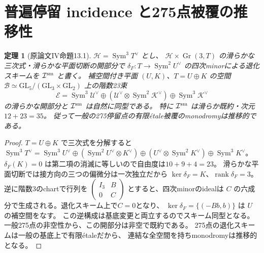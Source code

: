\documentclass[11pt,a4paper]{ltjsarticle}
\newtheorem{theorem}{定理}[section]
\newcommand{\Gr}{\operatorname{Gr}}
\newcommand{\Sym}{\operatorname{Sym}}
\begin{document}
\section{普遍停留 incidence と275点被覆の推移性}
\begin{theorem}[原論文IV命題13.1]\label{thm:reye-univ-incidence}
$\mathcal H=\Sym^3T^\vee$ とし、
$\mathcal H\times\Gr(3,T)$ の滑らかな三次式・滑らかな平面切断の開部分で
$\delta_F:T\to\Sym^2U^\vee$ の四次minorによる退化スキームを
$\mathcal I^{\rm sm}$ と書く。
補空間付き平面 $(U,K)$、$T=U\oplus K$ の空間
$\mathcal B\simeq\mathrm{GL}_5/(\mathrm{GL}_3\times\mathrm{GL}_2)$
上の階数23束
\[
 \mathcal E=\Sym^3\mathcal U^\vee\oplus
 (\mathcal U^\vee\otimes\Sym^2\mathcal K^\vee)\oplus
 \Sym^3\mathcal K^\vee
\]
の滑らかな開部分と $\mathcal I^{\rm sm}$ は自然に同型である。
特に $\mathcal I^{\rm sm}$ は滑らか既約・次元 $12+23=35$。
従って一般の275停留点の有限étale被覆のmonodromyは推移的である。
\end{theorem}
\begin{proof}
$T=U\oplus K$ で三次式を分解すると
$\Sym^3T^\vee=\Sym^3U^\vee\oplus
(\Sym^2U^\vee\otimes K^\vee)\oplus
(U^\vee\otimes\Sym^2K^\vee)\oplus\Sym^3K^\vee$。
$\delta_F(K)=0$ は第二項の消滅に等しいので自由度は$10+9+4=23$。
滑らかな平面切断では接方向の三つの偏微分は一次独立だから
$\ker\delta_F=K$、$\operatorname{rank}\delta_F=3$。
逆に階数3のchartで行列を
$\begin{pmatrix}I_3&B\\0&C\end{pmatrix}$ とすると、四次minorのidealは
$C$ の六成分で生成される。退化スキーム上で$C=0$となり、
$\ker\delta_F=\{(-Bb,b)\}$ は $U$ の補空間をなす。
この逆構成は基底変更と両立するのでスキーム同型となる。
一般275点の非空性から、この開部分は非空で既約である。
275点の退化スキームは一般の基底上で有限étaleだから、
連結な全空間を持ちmonodromyは推移的となる。
\end{proof}
\end{document}
